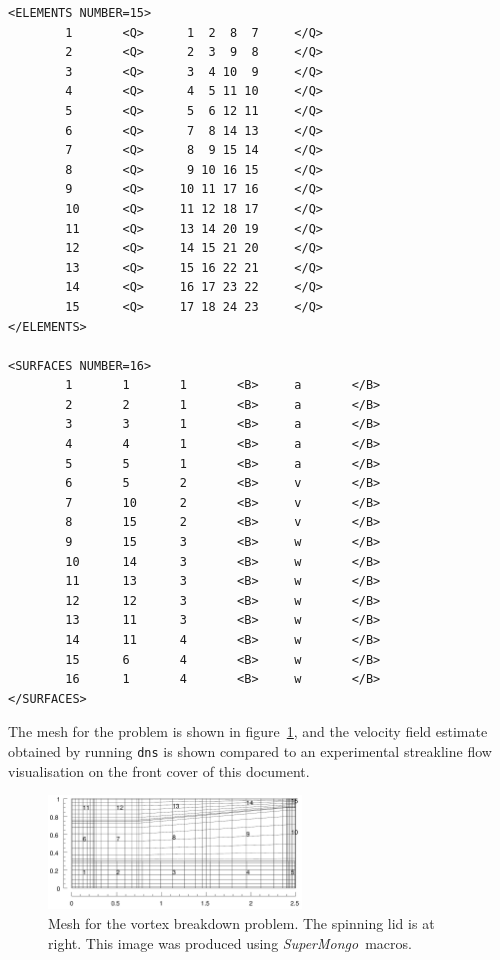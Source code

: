 \documentclass[11pt]{report}
\newcommand{\SM}{\emph{SuperMongo}}
\begin{document}
{\begin{verbatim}
<ELEMENTS NUMBER=15>
        1       <Q>      1  2  8  7     </Q>
        2       <Q>      2  3  9  8     </Q>
        3       <Q>      3  4 10  9     </Q>
        4       <Q>      4  5 11 10     </Q>
        5       <Q>      5  6 12 11     </Q>
        6       <Q>      7  8 14 13     </Q>
        7       <Q>      8  9 15 14     </Q>
        8       <Q>      9 10 16 15     </Q>
        9       <Q>     10 11 17 16     </Q>
        10      <Q>     11 12 18 17     </Q>
        11      <Q>     13 14 20 19     </Q>
        12      <Q>     14 15 21 20     </Q>
        13      <Q>     15 16 22 21     </Q>
        14      <Q>     16 17 23 22     </Q>
        15      <Q>     17 18 24 23     </Q>
</ELEMENTS>

<SURFACES NUMBER=16>
        1       1       1       <B>     a       </B>
        2       2       1       <B>     a       </B>
        3       3       1       <B>     a       </B>
        4       4       1       <B>     a       </B>
        5       5       1       <B>     a       </B>
        6       5       2       <B>     v       </B>
        7       10      2       <B>     v       </B>
        8       15      2       <B>     v       </B>
        9       15      3       <B>     w       </B>
        10      14      3       <B>     w       </B>
        11      13      3       <B>     w       </B>
        12      12      3       <B>     w       </B>
        13      11      3       <B>     w       </B>
        14      11      4       <B>     w       </B>
        15      6       4       <B>     w       </B>
        16      1       4       <B>     w       </B>
</SURFACES>
\end{verbatim}
}

The mesh for the problem is shown in figure~\ref{vb1msh}, and the
velocity field estimate obtained by running \verb|dns| is shown
compared to an experimental streakline flow visualisation on the front
cover of this document.
\begin{figure}
\begin{center}
\includegraphics[width=0.6\textwidth]{vb1mesh}
\end{center}
\caption{
\label{vb1msh}
  Mesh for the vortex breakdown problem.  The spinning lid is at
  right.  This image was produced using \SM\ macros.  }
\end{figure}
\end{document}
